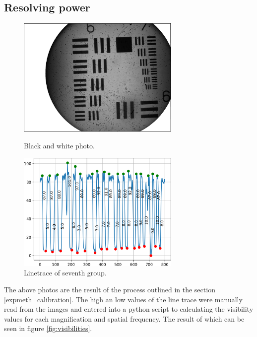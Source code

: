 \subsection{Resolving power}
\begin{figure}[h!]
    \centering
    \begin{minipage}{.5\textwidth}
      \centering
      \includegraphics[width=0.7\textwidth,keepaspectratio]{afbeeldingen/process_visibility/m3_bw.jpg}
      \caption{Black and white photo.}
      \label{fig:resolution_target}
    \end{minipage}%
    \begin{minipage}{.5\textwidth}
      \centering
      \includegraphics[width=0.7\textwidth,keepaspectratio]{afbeeldingen/process_visibility/m3_rpg_7.png}
      \caption{Linetrace of seventh group.}
      \label{fig:linetrace}
    \end{minipage}
\end{figure}

The above photos are the result of the process outlined in the section \ref{expmeth_calibration}. The high an low values of the line trace were manually read from the images and entered into a python script to calculating the visibility values for each magnification and spatial frequency. The result of which can be seen in figure \ref{fig:visibilities}.\\

